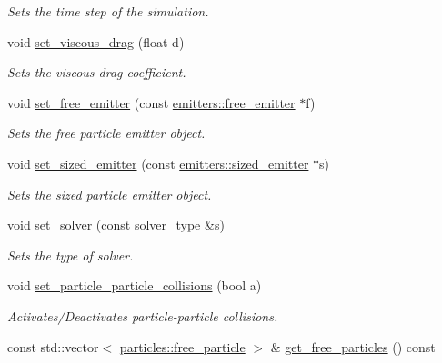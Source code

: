 \begin{DoxyCompactItemize}
\begin{DoxyCompactList}\small\item\em Sets the time step of the simulation. \end{DoxyCompactList}\item 
void \hyperlink{classphysim_1_1simulator_a6e6fc481334928bdcb13fa309fb62748}{set\+\_\+viscous\+\_\+drag} (float d)
\begin{DoxyCompactList}\small\item\em Sets the viscous drag coefficient. \end{DoxyCompactList}\item 
void \hyperlink{classphysim_1_1simulator_a83ab26eaa30b62959f6afcb9ec58696f}{set\+\_\+free\+\_\+emitter} (const \hyperlink{classphysim_1_1emitters_1_1free__emitter}{emitters\+::free\+\_\+emitter} $\ast$f)
\begin{DoxyCompactList}\small\item\em Sets the free particle emitter object. \end{DoxyCompactList}\item 
void \hyperlink{classphysim_1_1simulator_a39882b752b51378a547bab344933c49e}{set\+\_\+sized\+\_\+emitter} (const \hyperlink{classphysim_1_1emitters_1_1sized__emitter}{emitters\+::sized\+\_\+emitter} $\ast$s)
\begin{DoxyCompactList}\small\item\em Sets the sized particle emitter object. \end{DoxyCompactList}\item 
void \hyperlink{classphysim_1_1simulator_ac0724a6950d7ce81793f8dbeafbfd08a}{set\+\_\+solver} (const \hyperlink{namespacephysim_a09adeda29c09e651877e880d31fc9686}{solver\+\_\+type} \&s)
\begin{DoxyCompactList}\small\item\em Sets the type of solver. \end{DoxyCompactList}\item 
void \hyperlink{classphysim_1_1simulator_a46208fce1548645f874618b44edde065}{set\+\_\+particle\+\_\+particle\+\_\+collisions} (bool a)
\begin{DoxyCompactList}\small\item\em Activates/\+Deactivates particle-\/particle collisions. \end{DoxyCompactList}\item 
const std\+::vector$<$ \hyperlink{classphysim_1_1particles_1_1free__particle}{particles\+::free\+\_\+particle} $>$ \& \hyperlink{classphysim_1_1simulator_a8d030b30ee12814ea6a20faa7e61bd8c}{get\+\_\+free\+\_\+particles} () const

\end{DoxyCompactItemize}
